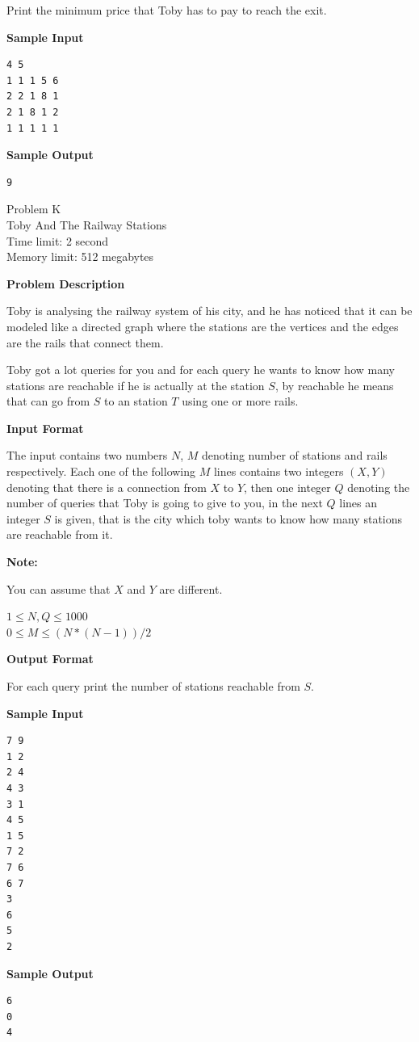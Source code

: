 \documentclass[11pt]{article}
\begin{document}
Print the minimum price that Toby has to pay to reach the exit.

\textbf{\large Sample Input}

\begin{verbatim}
4 5
1 1 1 5 6
2 2 1 8 1
2 1 8 1 2
1 1 1 1 1
\end{verbatim}

\textbf{\large Sample Output}

\begin{verbatim}
9
\end{verbatim}

\newpage
        \begin{center}
            {\LARGE Problem K}\\
            {\Large Toby And The Railway Stations}\\
            {Time limit: 2 second}\\
            {Memory limit: 512 megabytes}
        \end{center}\textbf{\large Problem Description}

Toby is analysing the railway system of his city, and he has noticed that it can
be modeled like a directed graph where the stations are the vertices and the edges
are the rails that connect them.

Toby got a lot queries for you and for each query he wants to know how many
stations are reachable if he is actually at the station $S$, by reachable he
means that can go from $S$ to an station $T$ using one or more rails.

\textbf{\large Input Format}

The input contains two numbers $N$, $M$ denoting number of stations and rails
respectively. Each one of the following $M$ lines contains two integers $(X, Y)$
denoting that there is a connection from $X$ to $Y$, then one integer $Q$
denoting the number of queries that Toby is going to give to you, in the next $Q$
lines an integer $S$ is given, that is the city which toby wants to know how
many stations are reachable from it.

\textbf{\large Note:}

You can assume that $X$ and $Y$ are different.

$1 \le N, Q \le 1000$ \\
$0 \le M \le (N * (N - 1)) / 2$ %

\textbf{\large Output Format}

For each query print the number of stations reachable from $S$.

\textbf{\large Sample Input}

\begin{verbatim}
7 9
1 2
2 4
4 3
3 1
4 5
1 5
7 2
7 6
6 7
3
6
5
2
\end{verbatim}

\textbf{\large Sample Output}

\begin{verbatim}
6
0
4
\end{verbatim}

\newpage
    
\end{document}
